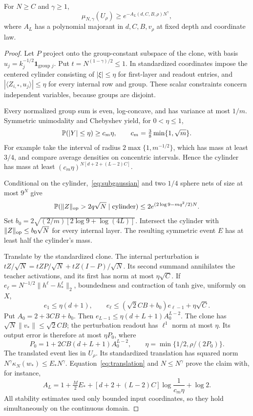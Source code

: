 \documentclass[11pt]{article}
\theoremstyle{remark}\newtheorem{remark}[theorem]{Remark}
\begin{document}
\begin{proposition}\label{prop:tube}
For $N\geq C$ and $\gamma\geq1$,
\begin{equation}\label{eq:tube-mass}
 \mu_{N,\gamma}(U_\rho)\geq e^{-A_L(d,C,B,\rho)N^\gamma},
\end{equation}
where $A_L$ has a polynomial majorant in $d,C,B,v_\rho$ at fixed
depth and coordinate law.
\end{proposition}
\begin{proof}
Let $P$ project onto the group-constant subspace of the clone, with basis
$u_j=k_j^{-1/2}\mathbf1_{\text{group }j}$. Put
$t=N^{(1-\gamma)/2}\leq1$. In standardized coordinates impose the
centered cylinder consisting of $|\xi|\leq\eta$ for first-layer and
readout entries, and $|\langle Z_{i,*},u_j\rangle|\leq\eta$ for every
internal row and group. These scalar constraints concern independent
variables, because groups are disjoint.

Every normalized group sum is even, log-concave, and has variance at most
$1/m$. Symmetric unimodality and Chebyshev yield, for $0<\eta\leq1$,
\[
 \mathbb P(|Y|\leq\eta)\geq c_m\eta,
 \qquad c_m=\tfrac38\min\{1,\sqrt m\}.
\]
For example take the interval of radius
$2\max\{1,m^{-1/2}\}$, which has mass at least $3/4$, and compare
average densities on concentric intervals. Hence the cylinder has mass
at least $(c_m\eta)^{N[d+2+(L-2)C]}$.

Conditional on the cylinder,~\eqref{eq:subgaussian} and two $1/4$ sphere
nets of size at most $9^N$ give
\[
 \mathbb P(\|Z\|_{\rm op}>2q\sqrt N\mid\text{cylinder})
 \leq2e^{(2\log9-mq^2/2)N}.
\]
Set $b_0=2\sqrt{(2/m)[2\log9+\log(4L)]}$. Intersect the cylinder
with $\|Z\|_{\rm op}\leq b_0\sqrt N$ for every internal layer.
The resulting symmetric event $E$ has at least half the cylinder's mass.

Translate by the standardized clone. The internal perturbation is
$tZ/\sqrt N=tZP/\sqrt N+tZ(I-P)/\sqrt N$. Its second summand
annihilates the teacher activations, and its first has norm at most
$\eta\sqrt C$. If $e_\ell=N^{-1/2}\|h^\ell-h_*^\ell\|_2$,
boundedness and contraction of tanh give, uniformly on $X$,
\[
 e_1\leq\eta(d+1),\qquad
 e_\ell\leq(\sqrt2CB+b_0)e_{\ell-1}+\eta\sqrt C.
\]
Put $A_0=2+3CB+b_0$. Then
$e_{L-1}\leq\eta(d+L+1)A_0^{L-2}$. The clone has
$\sqrt N\|v_*\|\leq\sqrt2CB$; the perturbation readout has
$\ell^1$ norm at most $\eta$. Its output error is therefore at most
$\eta P_0$, where
\[
 P_0=1+2CB(d+L+1)A_0^{L-2},\qquad
 \eta=\min\{1/2,\rho/(2P_0)\}.
\]
The translated event lies in $U_\rho$. Its standardized translation has
squared norm $N^\gamma\kappa_N(w_*)\leq E_*N^\gamma$.
Equation~\eqref{eq:translation} and $N\leq N^\gamma$ prove the claim
with, for instance,
\begin{equation}\label{eq:A}
 A_L=1+\tfrac M2E_*+[d+2+(L-2)C]\log\frac1{c_m\eta}+\log2.
\end{equation}
All stability estimates used only bounded input coordinates, so they
hold simultaneously on the continuous domain.
\end{proof}
\end{document}
